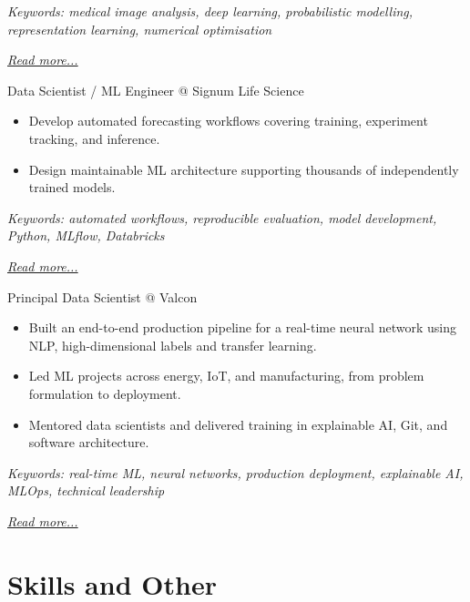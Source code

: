 \documentclass[11pt,a4paper]{moderncv}
\begin{document}
{\footnotesize\textit{Keywords: medical image analysis, deep learning, probabilistic modelling, representation learning, numerical optimisation}}

\hfill{\small{\textit{\hyperref[sec:raysearch]{Read more...}}}}

\large{Data Scientist / ML Engineer @ Signum Life Science}
\normalsize
\begin{itemize}
\item Develop automated forecasting workflows covering training, experiment tracking, and inference.
\item Design maintainable ML architecture supporting thousands of independently trained models.
\end{itemize}

{\footnotesize\textit{Keywords: automated workflows, reproducible evaluation, model development, Python, MLflow, Databricks}}

\hfill{\small{\textit{\hyperref[sec:signum]{Read more...}}}}

\large{Principal Data Scientist @ Valcon}
\normalsize
\begin{itemize}
\item Built an end-to-end production pipeline for a real-time neural network using NLP, high-dimensional labels and transfer learning.
\item Led ML projects across energy, IoT, and manufacturing, from problem formulation to deployment.
\item Mentored data scientists and delivered training in explainable AI, Git, and software architecture.
\end{itemize}

{\footnotesize\textit{Keywords: real-time ML, neural networks, production deployment, explainable AI, MLOps, technical leadership}}

\hfill{\small{\textit{\hyperref[sec:valcon]{Read more...}}}}


\section{Skills and Other}
\normalsize
{}
\end{document}
